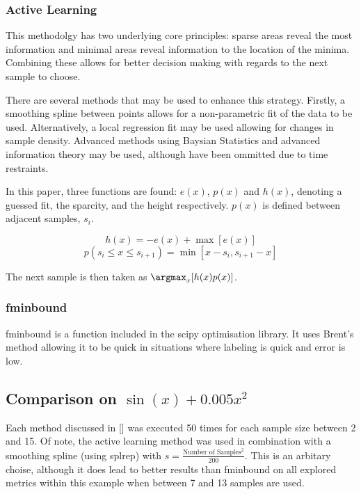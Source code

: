 \subsubsection{Active Learning}
This methodolgy has two underlying core principles: sparse areas reveal the most information and minimal areas reveal information to the location of the minima. Combining these allows for better decision making with regards to the next sample to choose.

There are several methods that may be used to enhance this strategy. Firstly, a smoothing spline between points allows for a non-parametric fit of the data to be used. Alternatively, a local regression fit may be used allowing for changes in sample density. Advanced methods using Baysian Statistics and advanced information theory may be used, although have been ommitted due to time restraints.

In this paper, three functions are found: $e(x)$, $p(x)$ and $h(x)$, denoting a guessed fit, the sparcity, and the height respectively. $p(x)$ is defined between adjacent samples, $s_i$.

\begin{equation}
  {h(x)=-e(x)+\max[e(x)]}
\end{equation}
\begin{equation}
  p(s_i \le x \le s_{i+1})=\min[x-s_i, s_{i+1}-x]
\end{equation}

The next sample is then taken as ${\argmax_x{[h(x)p(x)]}}$.

\subsubsection{fminbound}
fminbound is a function included in the scipy optimisation library. It uses Brent's method allowing it to be quick in situations where labeling is quick and error is low.
\subsection[Comparison One]{Comparison on $\sin(x)+0.005x^2$}

Each method discussed in [] was executed 50 times for each sample size between 2 and 15. Of note, the active learning method was used in combination with a smoothing spline (using splrep) with ${s = \frac{\text{Number of Samples}^2}{200}}$. This is an arbitary choise, although it does lead to better results than fminbound on all explored metrics within this example when between 7 and 13 samples are used.

